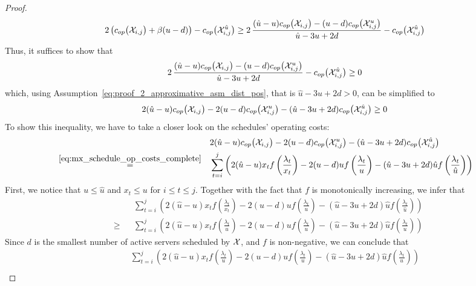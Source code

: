 \begin{proof}
\begin{align*}
	2\left(c_{op}\bigl(\mathcal{X}_{i,j}\bigr)+\beta(u-d)\right)-c_{op}\bigl(\mathcal{X}_{i,j}^{\hat{u}}\bigr)\ge2\,\frac{(\hat{u}-u)c_{op}\bigl(\mathcal{X}_{i,j}\bigr)-(u-d)c_{op}\bigl(\mathcal{X}_{i,j}^u\bigr)}{\hat{u}-3u+2d}-c_{op}\bigl(\mathcal{X}_{i,j}^{\hat{u}}\bigr)
\end{align*}
Thus, it suffices to show that
\begin{align*}
	2\,\frac{(\hat{u}-u)c_{op}\bigl(\mathcal{X}_{i,j}\bigr)-(u-d)c_{op}\bigl(\mathcal{X}_{i,j}^u\bigr)}{\hat{u}-3u+2d}-c_{op}\bigl(\mathcal{X}_{i,j}^{\hat{u}}\bigr)\ge 0
\end{align*}
which, using Assumption~\eqref{eq:proof_2_approximative_asm_dist_pos}, that is $\hat{u}-3u+2d>0$, can be simplified to
\begin{equation*}
	2(\hat{u}-u)c_{op}\bigl(\mathcal{X}_{i,j}\bigr)-2(u-d)c_{op}\bigl(\mathcal{X}_{i,j}^u\bigr)-(\hat{u}-3u+2d)c_{op}\bigl(\mathcal{X}_{i,j}^{\hat{u}}\bigr)\ge 0
\end{equation*}
To show this inequality, we have to take a closer look on the schedules' operating costs:
\begin{align*}
	&&&2(\hat{u}-u)c_{op}\bigl(\mathcal{X}_{i,j}\bigr)-2(u-d)c_{op}\bigl(\mathcal{X}_{i,j}^u\bigr)-(\hat{u}-3u+2d)c_{op}\bigl(\mathcal{X}_{i,j}^{\hat{u}}\bigr)\\
	&\stackrel{\eqref{eq:mx_schedule_op_costs_complete}}{=}&&\sum\limits_{t=i}^j\left(2(\hat{u}-u)x_tf\left(\frac{\lambda_t}{x_t}\right)-2(u-d)uf\left(\frac{\lambda_t}{u}\right)-(\hat{u}-3u+2d)\hat{u}f\left(\frac{\lambda_t}{\hat{u}}\right)\right)
\end{align*}
First, we notice that $u\le\hat{u}$ and $x_t\le u$ for $i\le t\le j$. Together with the fact that $f$ is monotonically increasing, we infer that
\begin{align*}
	&&&\sum\limits_{t=i}^j\left(2(\hat{u}-u)x_tf\left(\frac{\lambda_t}{x_t}\right)-2(u-d)uf\left(\frac{\lambda_t}{u}\right)-(\hat{u}-3u+2d)\hat{u}f\left(\frac{\lambda_t}{\hat{u}}\right)\right)\\
	&\ge&&\sum\limits_{t=i}^j\left(2(\hat{u}-u)x_tf\left(\frac{\lambda_t}{u}\right)-2(u-d)uf\left(\frac{\lambda_t}{u}\right)-(\hat{u}-3u+2d)\hat{u}f\left(\frac{\lambda_t}{u}\right)\right)
\end{align*}
Since $d$ is the smallest number of active servers scheduled by $\mathcal{X}$, and $f$ is non-negative, we can conclude that
\begin{align*}
	&&&\sum\limits_{t=i}^j\left(2(\hat{u}-u)x_tf\left(\frac{\lambda_t}{u}\right)-2(u-d)uf\left(\frac{\lambda_t}{u}\right)-(\hat{u}-3u+2d)\hat{u}f\left(\frac{\lambda_t}{u}\right)\right)\\

\end{align*}
\end{proof}
